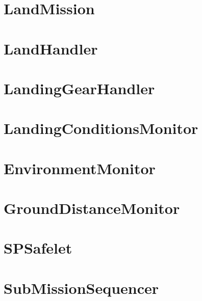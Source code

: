 \documentclass[10pt,a4paper,final]{article}
\begin{document}
\section{LandMission}

\pagebreak

\section{LandHandler}

\pagebreak

\section{LandingGearHandler}

\pagebreak

\section{LandingConditionsMonitor}

\pagebreak


\section{EnvironmentMonitor}

\pagebreak


\section{GroundDistanceMonitor}

\pagebreak











\section{SPSafelet}

\pagebreak






\section{SubMissionSequencer}

\pagebreak
\end{document}

